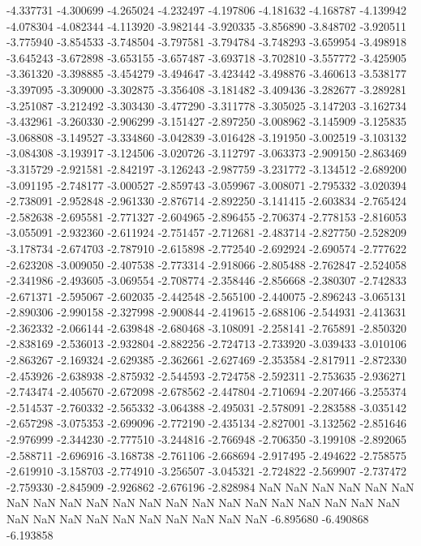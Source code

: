 -4.337731
-4.300699
-4.265024
-4.232497
-4.197806
-4.181632
-4.168787
-4.139942
-4.078304
-4.082344
-4.113920
-3.982144
-3.920335
-3.856890
-3.848702
-3.920511
-3.775940
-3.854533
-3.748504
-3.797581
-3.794784
-3.748293
-3.659954
-3.498918
-3.645243
-3.672898
-3.653155
-3.657487
-3.693718
-3.702810
-3.557772
-3.425905
-3.361320
-3.398885
-3.454279
-3.494647
-3.423442
-3.498876
-3.460613
-3.538177
-3.397095
-3.309000
-3.302875
-3.356408
-3.181482
-3.409436
-3.282677
-3.289281
-3.251087
-3.212492
-3.303430
-3.477290
-3.311778
-3.305025
-3.147203
-3.162734
-3.432961
-3.260330
-2.906299
-3.151427
-2.897250
-3.008962
-3.145909
-3.125835
-3.068808
-3.149527
-3.334860
-3.042839
-3.016428
-3.191950
-3.002519
-3.103132
-3.084308
-3.193917
-3.124506
-3.020726
-3.112797
-3.063373
-2.909150
-2.863469
-3.315729
-2.921581
-2.842197
-3.126243
-2.987759
-3.231772
-3.134512
-2.689200
-3.091195
-2.748177
-3.000527
-2.859743
-3.059967
-3.008071
-2.795332
-3.020394
-2.738091
-2.952848
-2.961330
-2.876714
-2.892250
-3.141415
-2.603834
-2.765424
-2.582638
-2.695581
-2.771327
-2.604965
-2.896455
-2.706374
-2.778153
-2.816053
-3.055091
-2.932360
-2.611924
-2.751457
-2.712681
-2.483714
-2.827750
-2.528209
-3.178734
-2.674703
-2.787910
-2.615898
-2.772540
-2.692924
-2.690574
-2.777622
-2.623208
-3.009050
-2.407538
-2.773314
-2.918066
-2.805488
-2.762847
-2.524058
-2.341986
-2.493605
-3.069554
-2.708774
-2.358446
-2.856668
-2.380307
-2.742833
-2.671371
-2.595067
-2.602035
-2.442548
-2.565100
-2.440075
-2.896243
-3.065131
-2.890306
-2.990158
-2.327998
-2.900844
-2.419615
-2.688106
-2.544931
-2.413631
-2.362332
-2.066144
-2.639848
-2.680468
-3.108091
-2.258141
-2.765891
-2.850320
-2.838169
-2.536013
-2.932804
-2.882256
-2.724713
-2.733920
-3.039433
-3.010106
-2.863267
-2.169324
-2.629385
-2.362661
-2.627469
-2.353584
-2.817911
-2.872330
-2.453926
-2.638938
-2.875932
-2.544593
-2.724758
-2.592311
-2.753635
-2.936271
-2.743474
-2.405670
-2.672098
-2.678562
-2.447804
-2.710694
-2.207466
-3.255374
-2.514537
-2.760332
-2.565332
-3.064388
-2.495031
-2.578091
-2.283588
-3.035142
-2.657298
-3.075353
-2.699096
-2.772190
-2.435134
-2.827001
-3.132562
-2.851646
-2.976999
-2.344230
-2.777510
-3.244816
-2.766948
-2.706350
-3.199108
-2.892065
-2.588711
-2.696916
-3.168738
-2.761106
-2.668694
-2.917495
-2.494622
-2.758575
-2.619910
-3.158703
-2.774910
-3.256507
-3.045321
-2.724822
-2.569907
-2.737472
-2.759330
-2.845909
-2.926862
-2.676196
-2.828984
NaN
NaN
NaN
NaN
NaN
NaN
NaN
NaN
NaN
NaN
NaN
NaN
NaN
NaN
NaN
NaN
NaN
NaN
NaN
NaN
NaN
NaN
NaN
NaN
NaN
NaN
NaN
NaN
NaN
NaN
NaN
-6.895680
-6.490868
-6.193858
